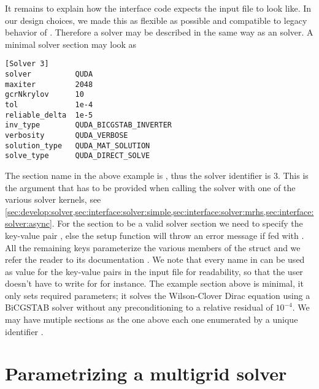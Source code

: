 It remains to explain how the \quda interface code expects the input file to look like.
In our design choices, we made this as flexible as possible and compatible to legacy behavior of \openqxd.
Therefore a \quda solver may be described in the same way as an \openqcd solver.
A minimal solver section may look as
\begin{verbatim}
[Solver 3]
solver          QUDA
maxiter         2048
gcrNkrylov      10
tol             1e-4
reliable_delta  1e-5
inv_type        QUDA_BICGSTAB_INVERTER
verbosity       QUDA_VERBOSE
solution_type   QUDA_MAT_SOLUTION
solve_type      QUDA_DIRECT_SOLVE
\end{verbatim}
The section name in the above example is , thus the solver identifier is \num{3}.
This is the argument  that has to be provided when calling the solver with one of the various solver kernels, see \cref{sec:develop:solver,sec:interface:solver:simple,sec:interface:solver:mrhs,sec:interface:solver:async}.
For the section to be a valid \quda solver section we need to specify the key-value pair , else the setup function will throw an error message if fed with .
All the remaining keys parameterize the various members of the  struct and we refer the reader to its documentation \cite{QUDApaper,github:quda}.
We note that every name in  can be used as value for the key-value pairs in the input file for readability, so that the user doesn't have to write  for  for instance.
The example section above is minimal, \ie it only sets required parameters; it solves the Wilson-Clover Dirac equation using a BiCGSTAB solver without any preconditioning to a relative residual of $10^{-4}$.
We may have mutiple sections as the one above each one enumerated by a unique identifier .

\section{Parametrizing a multigrid solver}
\label{sec:running:multgrid}


